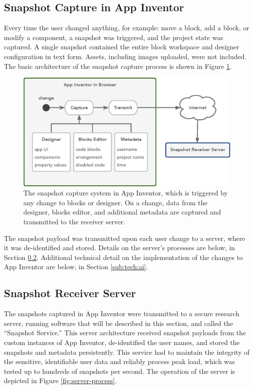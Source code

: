 \subsection{Snapshot Capture in App Inventor}
\label{sec:mod-ai}
Every time the user changed anything, for example: move a block, add a block, or modify a component, a snapshot was triggered, and the project state was captured. A single snapshot contained the entire block workspace and designer configuration in text form. Assets, including images uploaded, were not included. The basic architecture of the snapshot capture process is shown in Figure \ref{fig:snapshot-arch}.

\begin{figure}
  \centering
      \includegraphics[width=\textwidth]{diagrams/architecture}
  \caption[Snapshot Capture Design Diagram]{The snapshot capture system in App Inventor, which is triggered by any change to blocks or designer. On a change, data from the designer, blocks editor, and additional metadata are captured and transmitted to the receiver server.}
  \label{fig:snapshot-arch}
\end{figure}

The snapshot payload was transmitted upon each user change to a server, where it was de-identified and stored. Details on the server's processes are below, in Section \ref{sec:server}. Additional technical detail on the implementation of the changes to App Inventor are below, in Section \ref{sub:tech:ai}.

\subsection{Snapshot Receiver Server}
\label{sec:server}
The snapshots captured in App Inventor were transmitted to a secure research server, running software that will be described in this section, and called the ``Snapshot Service.'' This server architecture received snapshot payloads from the custom instances of App Inventor, de-identified the user names, and stored the snapshots and metadata persistently. This service had to maintain the integrity of the sensitive, identifiable user data and reliably process peak load, which was tested up to hundreds of snapshots per second. The operation of the server is depicted in Figure \ref{fig:server-process}.


